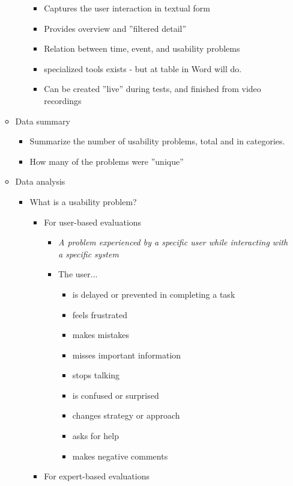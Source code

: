 \begin{itemize}
\begin{itemize}
\begin{itemize}
\begin{itemize}
				\item Captures the user interaction in textual form
				\item Provides overview and ''filtered detail''
				\item Relation between time, event, and usability problems
				\item specialized tools exists - but at table in Word will do.
				\item Can be created ''live'' during tests, and finished from video recordings
			\end{itemize}
		\end{itemize}
		\item Data summary
		\begin{itemize}
			\item Summarize the number of usability problems, total and in categories.
			\item How many of the problems were ''unique''
		\end{itemize}
		\item Data analysis
		\begin{itemize}
			\item What is a usability problem?
			\begin{itemize}
				\item For user-based evaluations
				\begin{itemize}
					\item \textit{A problem experienced by a specific user while interacting with a specific system}
					\item The user...
					\begin{itemize}
						\item is delayed or prevented in completing a task
						\item feels frustrated
						\item makes mistakes
						\item misses important information
						\item stops talking
						\item is confused or surprised
						\item changes strategy or approach
						\item asks for help
						\item makes negative comments
					\end{itemize}
				\end{itemize}
				\item For expert-based evaluations
				\begin{itemize}

\end{itemize}
\end{itemize}
\end{itemize}
\end{itemize}
\end{itemize}
